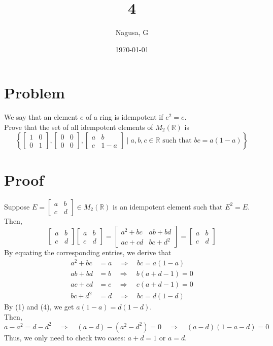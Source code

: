 \documentclass[11pt, a4paper]{article}
\title{4}
\author{Nagusa, G}
\date{\today}
\begin{document}
\maketitle

\section*{Problem}
We say that an element $e$ of a ring is idempotent if $e^2=e$.\\
Prove that the set of all idempotent elements of $M_2(\mathbb{R})$ is
\[
\left\{
\begin{bmatrix}
    1 & 0 \\
    0 & 1
\end{bmatrix}
,
\begin{bmatrix}
    0 & 0 \\
    0 & 0
\end{bmatrix}
,
\begin{bmatrix}
    a & b \\
    c & 1-a
\end{bmatrix}
\mid
a,b,c \in \mathbb{R}
\text{ such that }
bc = a(1-a)
\right\}
\]

\section*{Proof}
Suppose $E = \begin{bmatrix} a & b \\ c & d \end{bmatrix} \in M_2(\mathbb{R})$ is an idempotent element such that $E^2 = E$.\\
Then,
\[
\begin{bmatrix} a & b \\ c & d \end{bmatrix}
\begin{bmatrix} a & b \\ c & d \end{bmatrix}
=
\begin{bmatrix} a^2+bc & ab+bd \\ ac+cd & bc+d^2 \end{bmatrix}
=
\begin{bmatrix} a & b \\ c & d \end{bmatrix}
\]
By equating the corresponding entries, we derive that
\begin{align}
    a^2+bc &= a \quad \Rightarrow \quad bc = a(1-a) \\
    ab+bd &= b \quad \Rightarrow \quad b(a+d-1) = 0 \\
    ac+cd &= c \quad \Rightarrow \quad c(a+d-1) = 0 \\
    bc+d^2 &= d \quad \Rightarrow \quad bc = d(1-d)
\end{align}
By (1) and (4), we get $a(1-a) = d(1-d)$.\\
Then,
\[
a - a^2 = d - d^2 \quad \Rightarrow \quad (a-d) - (a^2-d^2) = 0 \quad \Rightarrow \quad (a-d)(1 - a - d) = 0
\]
Thus, we only need to check two cases: $a+d = 1$ or $a = d$.
\end{document}
